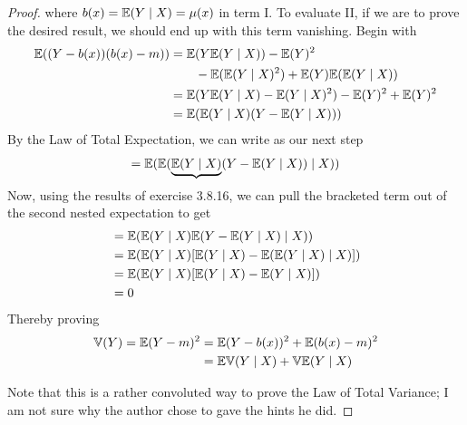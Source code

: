 \documentclass[a4paper]{article}
\begin{document}
\begin{proof}[Proof]
where \(b(x) = \mathbb{E}(Y  \mid  X) = \mu(x)\) in term I. To evaluate II, if we are to prove the desired result, we should end up with this term vanishing. Begin with
\begin{align*}
	\mathbb{E}((Y - b(x))(b(x) - m)) & = \mathbb{E}(Y \mathbb{E}(Y  \mid  X)) - \mathbb{E}(Y)^{2} \\
				 & \qquad - \mathbb{E}(\mathbb{E}(Y \mid X)^{2}) + \mathbb{E}(Y) \mathbb{E}(\mathbb{E}(Y \mid X)) \\
	 & = \mathbb{E}(Y \mathbb{E}(Y \mid X) - \mathbb{E}(Y \mid X)^{2}) - \mathbb{E}(Y)^{2} + \mathbb{E}(Y)^{2} \\ 
	 & = \mathbb{E}(\mathbb{E}(Y \mid X) (Y - \mathbb{E}(Y \mid X)))
\end{align*}
By the Law of Total Expectation, we can write as our next step
\[
	= \mathbb{E}(\mathbb{E}(\underbrace{\mathbb{E}(Y \mid X)}(Y - \mathbb{E}(Y \mid X)) \mid X))
\]
Now, using the results of exercise 3.8.16, we can pull the bracketed term out of the second nested expectation to get
\begin{align*}
	 & = \mathbb{E}(\mathbb{E}(Y \mid X) \mathbb{E}(Y - \mathbb{E}(Y \mid X)  \mid  X)) \\
	 & = \mathbb{E}(\mathbb{E}(Y \mid X) [\mathbb{E}(Y \mid X) - \mathbb{E}(\mathbb{E}(Y \mid X)  \mid  X)]) \\ 
	 & = \mathbb{E}(\mathbb{E}(Y \mid X)[\mathbb{E}(Y \mid X) - \mathbb{E}(Y \mid X)]) \\
	 & = 0
\end{align*}
Thereby proving
\begin{align*}
	\mathbb{V}(Y) = \mathbb{E}(Y-m)^{2} & = \mathbb{E}(Y - b(x))^{2} + \mathbb{E}(b(x) - m)^{2} \\
	 & = \mathbb{E} \mathbb{V}(Y \mid X) + \mathbb{V} \mathbb{E}(Y \mid X)  \\ 
\end{align*}

Note that this is a rather convoluted way to prove the Law of Total Variance; I am not sure why the author chose to gave the hints he did.
\end{proof}
\end{document}
